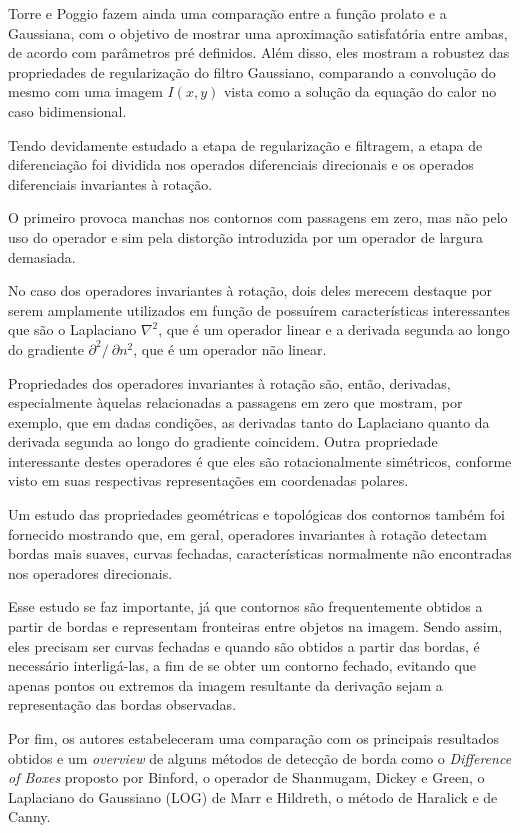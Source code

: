 \begin{enumerate}
\begin{enumerate}[label*=\arabic*.]
    Torre e Poggio fazem ainda uma comparação entre a função prolato e a Gaussiana, com o objetivo de mostrar uma aproximação satisfatória entre ambas, de acordo com parâmetros pré definidos. Além disso, eles mostram a robustez das propriedades de regularização do filtro Gaussiano, comparando a convolução do mesmo com uma imagem $I(x, y)$ vista como a solução da equação do calor no caso bidimensional.
    
    Tendo devidamente estudado a etapa de regularização e filtragem, a etapa de diferenciação foi dividida nos operados diferenciais direcionais e os operados diferenciais invariantes à rotação.
    
    O primeiro provoca manchas nos contornos com passagens em zero, mas não pelo uso do operador e sim pela distorção introduzida por um operador de largura demasiada.
    
    No caso dos operadores invariantes à rotação, dois deles merecem destaque por serem amplamente utilizados em função de possuírem características interessantes que são o Laplaciano $\nabla ^2$, que é um operador linear e a derivada segunda ao longo do gradiente $\partial^2 /\ \partial n^2$, que é um operador não linear.
    
    Propriedades dos operadores invariantes à rotação são, então, derivadas, especialmente àquelas relacionadas a passagens em zero que mostram, por exemplo, que em dadas condições, as derivadas tanto do Laplaciano quanto da derivada segunda ao longo do gradiente coincidem. Outra propriedade interessante destes operadores é que eles são rotacionalmente simétricos, conforme visto em suas respectivas representações em coordenadas polares.
    
    Um estudo das propriedades geométricas e topológicas dos contornos também foi fornecido mostrando que, em geral, operadores invariantes à rotação detectam bordas mais suaves, curvas fechadas, características normalmente não encontradas nos operadores direcionais.
    
    Esse estudo se faz importante, já que contornos são frequentemente obtidos a partir de bordas e representam fronteiras entre objetos na imagem. Sendo assim, eles precisam ser curvas fechadas e quando são obtidos a partir das bordas, é necessário interligá-las, a fim de se obter um contorno fechado, evitando que apenas pontos ou extremos da imagem resultante da derivação sejam a representação das bordas observadas.
    
    Por fim, os autores estabeleceram uma comparação com os principais resultados obtidos e um \textit{overview} de alguns métodos de detecção de borda como o \textit{Difference of Boxes} proposto por Binford, o operador de Shanmugam, Dickey e Green, o Laplaciano do Gaussiano (LOG) de Marr e Hildreth, o método de Haralick e de Canny.


\end{enumerate}
\end{enumerate}
